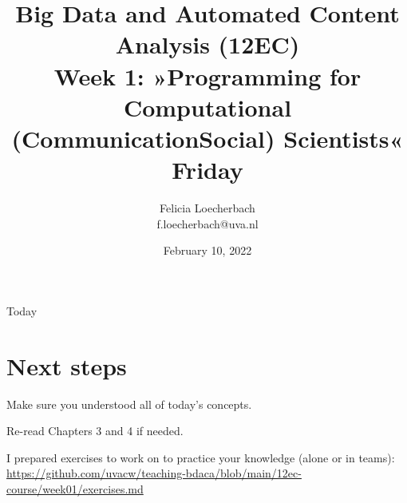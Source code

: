 \documentclass[compress]{beamer}
\begin{document}
\title[Big Data and Automated Content Analysis]{\textbf{Big Data and Automated Content Analysis (12EC)} 
\\Week 1: »Programming for Computational (Communication\textbar Social) Scientists«
\\Friday }
\author[Felicia Loecherbach]{Felicia Loecherbach\\ \footnotesize{f.loecherbach@uva.nl\\}}
\date{February 10, 2022}


\begin{frame}{}
	\titlepage
\end{frame}

\begin{frame}{Today}
	\tableofcontents
\end{frame}










\section{Next steps}




\begin{frame}[standout]
Make sure you understood all of today's concepts.

Re-read Chapters 3 and 4 if needed.

I prepared exercises to work on to practice your knowledge (alone or in teams):
\large{\url{https://github.com/uvacw/teaching-bdaca/blob/main/12ec-course/week01/exercises.md}}
\end{frame}





\begin{frame}
	\printbibliography
\end{frame}
\end{document}
